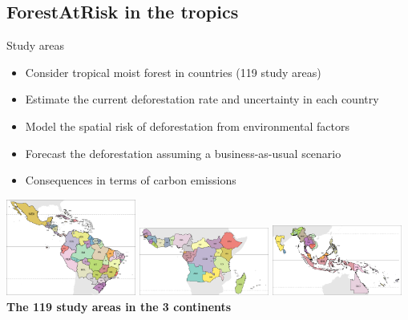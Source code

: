 \documentclass[10pt,table,dvipsnames,compress]{beamer}
\begin{document}
\subsection{ForestAtRisk in the tropics}
\label{sec:orgea4c3bb}
\begin{frame}[label={sec:orgaab9a35}]{Study areas}
\begin{itemize}
\item {} Consider tropical moist forest in  countries (119 study areas)
\item {} Estimate the current deforestation rate and uncertainty in each country
\item {} Model the spatial risk of deforestation from environmental factors
\item {} Forecast the deforestation assuming a business-as-usual scenario
\item {} Consequences in terms of carbon emissions
\end{itemize}

\vspace{0.5cm}
\begin{center}
\includegraphics[width=0.32\textwidth]{figs/sm/study_areas_America}
\includegraphics[width=0.32\textwidth]{figs/sm/study_areas_Africa}
\includegraphics[width=0.32\textwidth]{figs/sm/study_areas_Asia}
\textbf{The 119 study areas in the 3 continents}
\end{center}
\end{frame}
\end{document}
